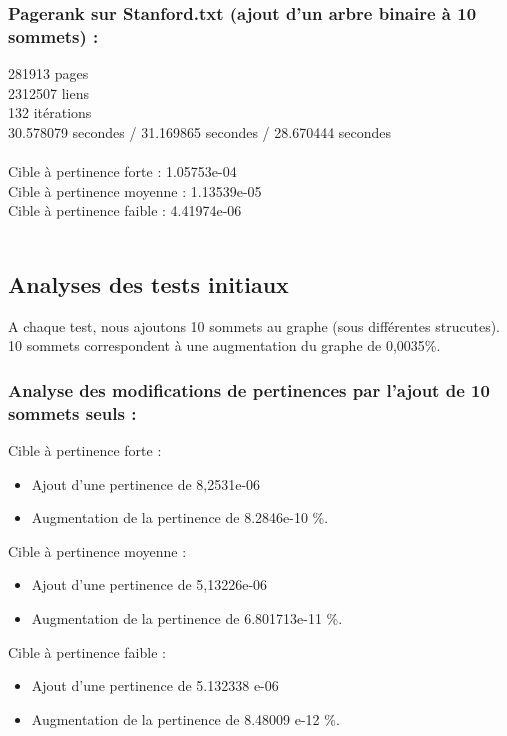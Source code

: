 \documentclass[a4paper,11pt]{article}
\begin{document}
		\subsubsection{Pagerank sur Stanford.txt (ajout d'un arbre binaire à 10 sommets) :}
			281913 pages\\
			2312507 liens\\
			132 itérations\\
			30.578079 secondes / 31.169865 secondes / 28.670444 secondes\\
			\\
			Cible à pertinence forte : 1.05753e-04\\
			Cible à pertinence moyenne : 1.13539e-05\\
			Cible à pertinence faible : 4.41974e-06\\
			\\
	\subsection{Analyses des tests initiaux}
		A chaque test, nous ajoutons 10 sommets au graphe (sous différentes strucutes). 10 sommets correspondent à une augmentation du graphe de 0,0035\%.\\
		\subsubsection{Analyse des modifications de pertinences par l'ajout de 10 sommets seuls :}
			Cible à pertinence forte :
			\begin{itemize} 	
				\item Ajout d'une pertinence de 8,2531e-06
				\item Augmentation de la pertinence de 8.2846e-10 \%.
			\end{itemize}
			Cible à pertinence moyenne :
			\begin{itemize} 	
				\item Ajout d'une pertinence de 5,13226e-06
				\item Augmentation de la pertinence de 6.801713e-11 \%.
			\end{itemize}
			Cible à pertinence faible :
			\begin{itemize} 	
				\item Ajout d'une pertinence de 5.132338 e-06
				\item Augmentation de la pertinence de 8.48009 e-12 \%.
			\end{itemize}
\end{document}
